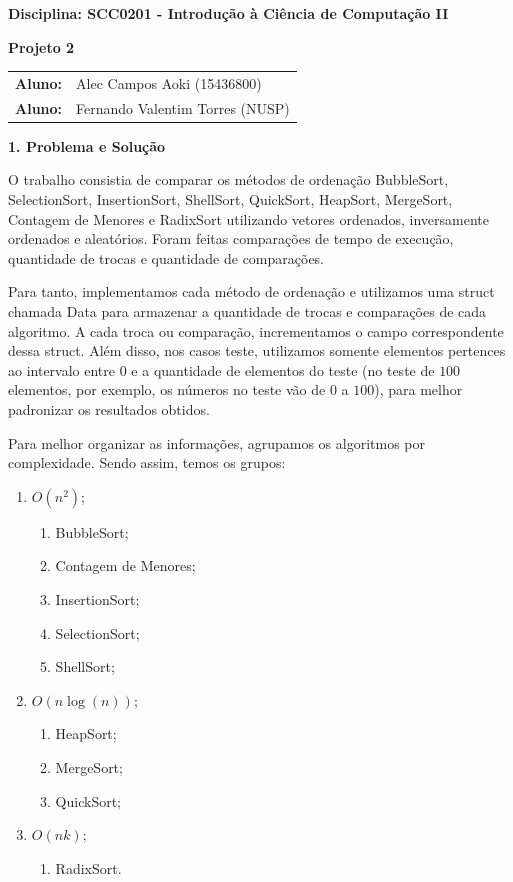 \documentclass[10pt]{article}
\begin{document}
\begin{center}
    \large\textbf{Disciplina: SCC0201 - Introdução à Ciência de Computação II}
    
    \large\textbf{Projeto 2}
\end{center}

\begin{tabular}{@{}ll@{}}
\textbf{Aluno:} & Alec Campos Aoki (15436800)\\
\textbf{Aluno:} & Fernando Valentim Torres (NUSP)
\end{tabular}

\vspace{0.5cm}

\textbf{1. Problema e Solução}

O trabalho consistia de comparar os métodos de ordenação BubbleSort, SelectionSort, InsertionSort, ShellSort, QuickSort, HeapSort, MergeSort, Contagem de Menores e RadixSort utilizando vetores ordenados, inversamente ordenados e aleatórios. Foram feitas comparações de tempo de execução, quantidade de trocas e quantidade de comparações.

Para tanto, implementamos cada método de ordenação e utilizamos uma struct chamada Data para armazenar a quantidade de trocas e comparações de cada algoritmo. A cada troca ou comparação, incrementamos o campo correspondente dessa struct. Além disso, nos casos teste, utilizamos somente elementos pertences ao intervalo entre 0 e a quantidade de elementos do teste (no teste de $100$ elementos, por exemplo, os números no teste vão de $0$ a $100$), para melhor padronizar os resultados obtidos.

Para melhor organizar as informações, agrupamos os algoritmos por complexidade. Sendo assim, temos os grupos:

\begin{enumerate}
  \item $O(n^2)$;
  \begin{enumerate}
    \item BubbleSort;
    \item Contagem de Menores;
    \item InsertionSort;
    \item SelectionSort;
    \item ShellSort;
  \end{enumerate}
  \item $O(n \log(n))$;
  \begin{enumerate}
    \item HeapSort;
    \item MergeSort;
    \item QuickSort;
  \end{enumerate}
  \item $O(n k)$;
  \begin{enumerate}
    \item RadixSort.
  \end{enumerate}
\end{enumerate}
\end{document}
